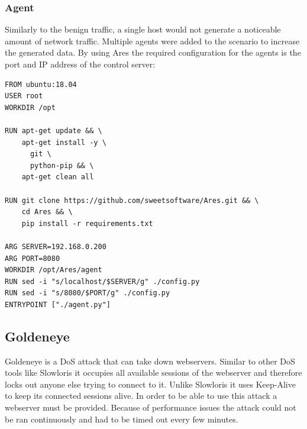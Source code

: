 \documentclass[conference]{IEEEtran}
\begin{document}
\subsubsection{Agent}
Similarly to the benign traffic, a single host would not generate a noticeable amount of network traffic. Multiple agents were added to the scenario to increase the generated data. By using Ares the required configuration for the agents is the port and IP address of the control server:

\begin{lstlisting}[basicstyle=\footnotesize]
FROM ubuntu:18.04
USER root
WORKDIR /opt

RUN apt-get update && \
    apt-get install -y \
      git \
      python-pip && \
    apt-get clean all

RUN git clone https://github.com/sweetsoftware/Ares.git && \
    cd Ares && \
    pip install -r requirements.txt

ARG SERVER=192.168.0.200
ARG PORT=8080
WORKDIR /opt/Ares/agent
RUN sed -i "s/localhost/$SERVER/g" ./config.py
RUN sed -i "s/8080/$PORT/g" ./config.py
ENTRYPOINT ["./agent.py"]
\end{lstlisting}

\subsection{Goldeneye}
Goldeneye is a DoS attack that can take down webservers. Similar to other DoS tools like Slowloris it occupies all available sessions of the webserver and therefore locks out anyone else trying to connect to it. Unlike Slowloris it uses Keep-Alive to keep its connected sessions alive. 
In order to be able to use this attack a webserver must be provided. Because of performance issues the attack could not be ran continuously and had to be timed out every few minutes. 
\end{document}
